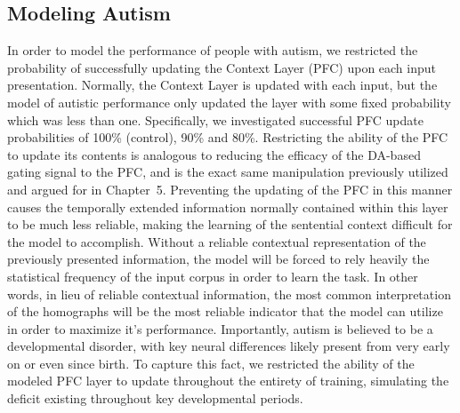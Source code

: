 \documentclass[man]{apa}
\begin{document}
\subsection{Modeling Autism}

In order to model the performance of people with autism, we restricted the probability of successfully updating the Context Layer (PFC) upon each input presentation.  Normally, the Context Layer is updated with each input, but the model of autistic performance only updated the layer with some fixed probability which was less than one.  Specifically, we investigated successful PFC update probabilities of 100\% (control), 90\% and 80\%.  Restricting the ability of the PFC to update its contents is analogous to reducing the efficacy of the DA-based gating signal to the PFC, and is the exact same manipulation previously utilized and argued for in Chapter~5.   Preventing the updating of the PFC in this manner causes the temporally extended information normally contained within this layer to be much less reliable, making the learning of the sentential context difficult for the model to accomplish.  Without a reliable contextual representation of the previously presented information, the model will be forced to rely heavily the statistical frequency of the input corpus in order to learn the task.  In other words, in lieu of reliable contextual information, the most common interpretation of the homographs will be the most reliable indicator that the model can utilize in order to maximize it's performance. Importantly, autism is believed to be a developmental disorder, with key neural differences likely present from very early on or even since birth.  To capture this fact, we restricted the ability of the modeled PFC layer to update throughout the entirety of training, simulating the deficit existing throughout key developmental periods.
\end{document}
